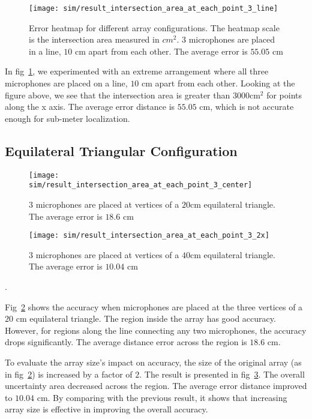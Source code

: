 \begin{figure}[h!]
  \texttt{[image: sim/result\_intersection\_area\_at\_each\_point\_3\_line]}
  \caption{Error heatmap for different array configurations. The heatmap scale is the intersection area measured in $cm^2$. $3$ microphones are placed in a line, $10$ cm apart from each other. The average error is $55.05$ cm}
  \label{fig:sim_hm_3_line}
\end{figure}


In fig~\ref{fig:sim_hm_3_line}, we experimented with an extreme arrangement where all three microphones are placed on a line, $10$ cm apart from each other. Looking at the figure above, we see that the intersection area is greater than $3000 \mathrm{cm}^2$ for points along the x axis. The average error distance is $55.05$ cm, which is not accurate enough for sub-meter localization. 

\subsection{Equilateral Triangular Configuration}

\begin{figure*}[h!]
\centering
  \begin{subfigure}[]{.48\textwidth}
    \texttt{[image: sim/result\_intersection\_area\_at\_each\_point\_3\_center]}
    \caption{$3$ microphones are placed at vertices of a $20$cm equilateral triangle. The average error is $18.6$ cm}
    \label{fig:sim_hm_3}
  \end{subfigure}
  \begin{subfigure}[]{.48\textwidth}
    \texttt{[image: sim/result\_intersection\_area\_at\_each\_point\_3\_2x]}
    \caption{$3$ microphones are placed at vertices of a $40$cm equilateral triangle. The average error is $10.04$ cm}
    \label{fig:sim_hm_3_2x}
  \end{subfigure}
  \caption{Error heatmap for different array configurations. The heatmap scale is the intersection area measured in $cm^2$}.
\end{figure*}

Fig~\ref{fig:sim_hm_3} shows the accuracy when microphones are placed at the three vertices of a $20$ cm equilateral triangle. The region inside the array has good accuracy. However, for regions along the line connecting any two microphones, the accuracy drops significantly. The average distance error across the region is $18.6$ cm.

To evaluate the array size's impact on accuracy, the size of the original array (as in fig~\ref{fig:sim_hm_3}) is increased by a factor of $2$. The result is presented in fig~\ref{fig:sim_hm_3_2x}. The overall uncertainty area decreased across the region. The average error distance improved to $10.04$ cm. By comparing with the previous result, it shows that increasing array size is effective in improving the overall accuracy. 

